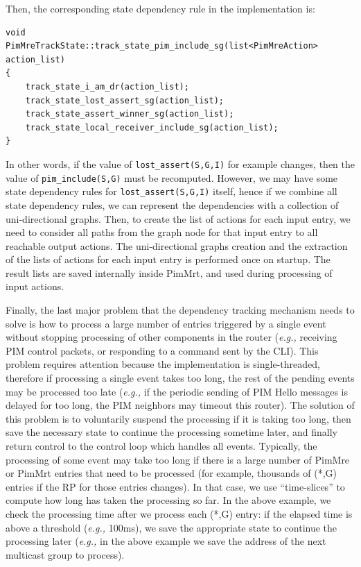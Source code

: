 \documentclass[11pt]{article}
\newcommand{\eg}{\emph{e.g.,}\xspace}
\begin{document}
Then, the corresponding state dependency rule in the implementation is:

\begin{verbatim}
void
PimMreTrackState::track_state_pim_include_sg(list<PimMreAction> action_list)
{
    track_state_i_am_dr(action_list);
    track_state_lost_assert_sg(action_list);
    track_state_assert_winner_sg(action_list);
    track_state_local_receiver_include_sg(action_list);
}
\end{verbatim}

In other words, if the value of \verb=lost_assert(S,G,I)= for example changes,
then the value of \verb=pim_include(S,G)= must be recomputed.
However, we may have some state dependency rules for
\verb=lost_assert(S,G,I)= itself, hence if we combine all state
dependency rules, we can represent the dependencies with a collection
of uni-directional graphs. Then, to create the list of actions for each
input entry, we need to consider all paths from the graph node for
that input entry to all reachable output actions.
The uni-directional graphs creation and the extraction of the lists of
actions for each input entry is performed once on startup. The result
lists are saved internally inside PimMrt, and used during processing of
input actions.

Finally, the last major problem that the dependency tracking mechanism
needs to solve is how to process a large number of entries triggered by
a single event without stopping processing of other components in the
router (\eg receiving PIM control packets, or responding to a command
sent by the CLI). This problem requires attention
because the implementation is single-threaded, therefore if processing a
single event takes too long, the rest of the pending events may
be processed too late (\eg if the periodic sending of PIM Hello messages
is delayed for too long, the PIM neighbors may timeout this
router). The solution of this problem is to voluntarily suspend
the processing if it is taking too long, then save the necessary state
to continue the processing sometime later, and finally return control to
the control loop which handles all events. Typically, the processing of
some event may take too
long if there is a large number of PimMre or PimMrt entries that
need to be processed (for example, thousands of (*,G) entries if the RP
for those entries changes). In that case, we use ``time-slices'' to
compute how long has taken the processing so far.
In the above example, we check the processing time after we process each
(*,G) entry: if the elapsed time is above a threshold (\eg 100ms),
we save the appropriate state to continue the
processing later (\eg in the above example we save the address of the
next multicast group to process).
\end{document}
